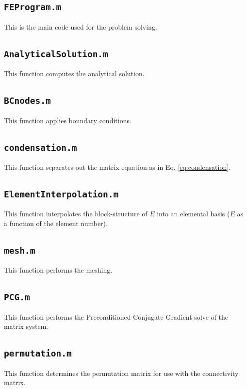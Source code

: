 \documentclass[10pt]{article}
\begin{document}
\subsection{\texttt{FEProgram.m}}
This is the main code used for the problem solving.


\subsection{\texttt{AnalyticalSolution.m}}
This function computes the analytical solution.


\subsection{\texttt{BCnodes.m}}
This function applies boundary conditions.


\subsection{\texttt{condensation.m}}
This function separates out the matrix equation as in Eq. \eqref{eq:condensation}.


\subsection{\texttt{ElementInterpolation.m}}
This function interpolates the block-structure of \(E\) into an elemental basis (\(E\) as a function of the element number).


\subsection{\texttt{mesh.m}}
This function performs the meshing.


\subsection{\texttt{PCG.m}}
This function performs the Preconditioned Conjugate Gradient solve of the matrix system.


\subsection{\texttt{permutation.m}}
This function determines the permutation matrix for use with the connectivity matrix.

\end{document}
